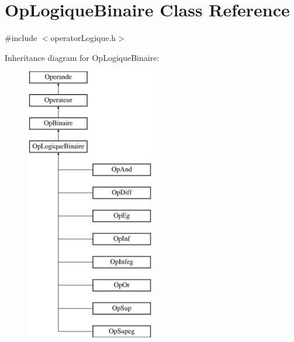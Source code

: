 \hypertarget{class_op_logique_binaire}{}\section{Op\+Logique\+Binaire Class Reference}
\label{class_op_logique_binaire}


{\ttfamily \#include $<$operator\+Logique.\+h$>$}

Inheritance diagram for Op\+Logique\+Binaire\+:\begin{figure}[H]
\begin{center}
\leavevmode
\includegraphics[height=12.000000cm]{class_op_logique_binaire}
\end{center}
\end{figure}
